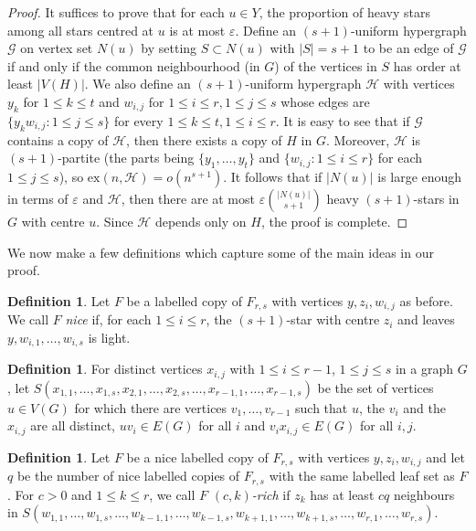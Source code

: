 \documentclass[11pt]{article}
\numberwithin{equation}{section}
\theoremstyle{definition}
\newtheorem{definition}[theorem]{\bf Definition}
\def\eps{\varepsilon}
\def\cG{\mathcal{G}}
\def\cH{\mathcal{H}}
\def\ex{\mathrm{ex}}
\begin{document}
\begin{proof}
	It suffices to prove that for each $u\in Y$, the proportion of heavy stars among all stars centred at $u$ is at most $\eps$. Define an $(s+1)$-uniform hypergraph $\cG$ on vertex set $N(u)$ by setting $S\subset N(u)$ with $|S| = s+1$ to be an edge of $\cG$ if and only if the common neighbourhood (in $G$) of the vertices in $S$ has order at least $|V(H)|$. We also define an $(s+1)$-uniform hypergraph $\cH$ with vertices $y_k$ for $1\leq k\leq t$ and $w_{i,j}$ for $1\leq i\leq r,1\leq j\leq s$ whose edges are $\{y_kw_{i,j}: 1\leq j\leq s\}$ for every $1\leq k\leq t,1\leq i\leq r$. It is easy to see that if $\cG$ contains a copy of $\cH$, then there exists a copy of $H$ in $G$. Moreover, $\cH$ is $(s+1)$-partite (the parts being $\{y_1,\dots,y_t\}$ and $\{w_{i,j}:1\leq i\leq r\}$ for each $1\leq j\leq s$), so $\ex(n,\cH)=o(n^{s+1})$. It follows that if $|N(u)|$ is large enough in terms of $\eps$ and $\cH$, then there are at most $\eps \binom{|N(u)|}{s+1}$ heavy $(s+1)$-stars in $G$ with centre $u$. Since $\cH$ depends only on $H$, the proof is complete.
\end{proof}

We now make a few definitions which capture some of the main ideas in our proof.

\begin{definition}
	Let $F$ be a labelled copy of $F_{r,s}$ with vertices $y,z_i,w_{i,j}$ as before. We call $F$ \emph{nice} if, for each $1\leq i\leq r$, the $(s+1)$-star with centre $z_i$ and leaves $y,w_{i,1},\dots,w_{i,s}$ is light.
\end{definition}

\begin{definition} \label{def:locus}
	\sloppy For distinct vertices $x_{i,j}$ with $1\leq i\leq r-1$, $1\leq j\leq s$ in a graph $G$, let $S(x_{1,1},\dots,x_{1,s},x_{2,1},\dots,x_{2,s},\dots,x_{r-1,1},\dots,x_{r-1,s})$ be the set of vertices $u\in V(G)$ for which there are vertices $v_1,\dots,v_{r-1}$ such that $u$, the $v_i$ and the $x_{i,j}$ are all distinct, $uv_i\in E(G)$ for all $i$ and $v_ix_{i,j}\in E(G)$ for all $i,j$.
\end{definition}

\begin{definition}
	\sloppy Let $F$ be a nice labelled copy of $F_{r,s}$ with vertices $y,z_i,w_{i,j}$ and let $q$ be the number of nice labelled copies of $F_{r,s}$ with the same labelled leaf set as $F$. For $c>0$ and $1\leq k\leq r$, we call $F$ \emph{$(c,k)$-rich} if $z_k$ has at least $cq$ neighbours in $S(w_{1,1},\dots,w_{1,s},\dots,w_{k-1,1},\dots,w_{k-1,s},w_{k+1,1},\dots,w_{k+1,s},\dots,w_{r,1},\dots,w_{r,s})$.
\end{definition}
\end{document}
